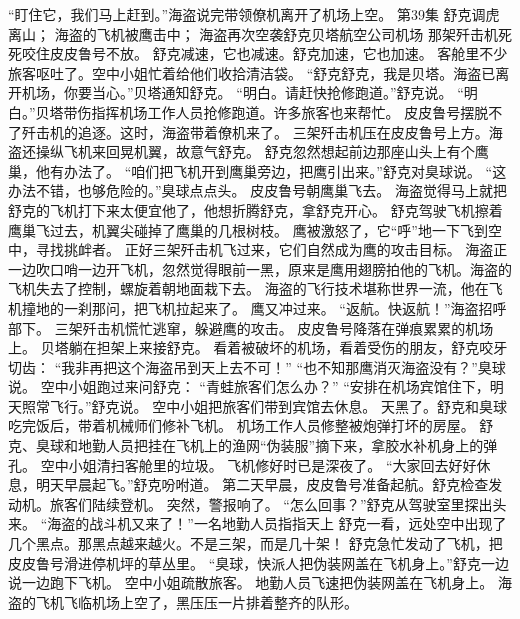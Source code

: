 \documentclass[a4paper,12pt,UTF8,twoside]{ctexbook}
\begin{document}
        “盯住它，我们马上赶到。”海盗说完带领僚机离开了机场上空。   第39集 
        舒克调虎离山； 
        海盗的飞机被鹰击中； 
        海盗再次空袭舒克贝塔航空公司机场   
        那架歼击机死死咬住皮皮鲁号不放。 
        舒克减速，它也减速。舒克加速，它也加速。 
        客舱里不少旅客呕吐了。空中小姐忙着给他们收拾清洁袋。 
        “舒克舒克，我是贝塔。海盗已离开机场，你要当心。”贝塔通知舒克。 
        “明白。请赶快抢修跑道。”舒克说。 
        “明白。”贝塔带伤指挥机场工作人员抢修跑道。许多旅客也来帮忙。 
        皮皮鲁号摆脱不了歼击机的追逐。这时，海盗带着僚机来了。 
        三架歼击机压在皮皮鲁号上方。海盗还操纵飞机来回晃机翼，故意气舒克。 
        舒克忽然想起前边那座山头上有个鹰巢，他有办法了。 
        “咱们把飞机开到鹰巢旁边，把鹰引出来。”舒克对臭球说。 
        “这办法不错，也够危险的。”臭球点点头。 
        皮皮鲁号朝鹰巢飞去。 
        海盗觉得马上就把舒克的飞机打下来太便宜他了，他想折腾舒克，拿舒克开心。 
        舒克驾驶飞机擦着鹰巢飞过去，机翼尖碰掉了鹰巢的几根树枝。 
        鹰被激怒了，它“呼”地一下飞到空中，寻找挑衅者。 
        正好三架歼击机飞过来，它们自然成为鹰的攻击目标。 
        海盗正一边吹口哨一边开飞机，忽然觉得眼前一黑，原来是鹰用翅膀拍他的飞机。海盗的飞机失去了控制，螺旋着朝地面栽下去。 
        海盗的飞行技术堪称世界一流，他在飞机撞地的一刹那问，把飞机拉起来了。 
        鹰又冲过来。 
        “返航。快返航！”海盗招呼部下。 
        三架歼击机慌忙逃窜，躲避鹰的攻击。 
        皮皮鲁号降落在弹痕累累的机场上。 
        贝塔躺在担架上来接舒克。 
        看着被破坏的机场，看着受伤的朋友，舒克咬牙切齿： 
        “我非再把这个海盗吊到天上去不可！” 
        “也不知那鹰消灭海盗没有？”臭球说。 
        空中小姐跑过来问舒克： 
        “青蛙旅客们怎么办？” 
        “安排在机场宾馆住下，明天照常飞行。”舒克说。 
        空中小姐把旅客们带到宾馆去休息。 
        天黑了。舒克和臭球吃完饭后，带着机械师们修补飞机。 
        机场工作人员修整被炮弹打坏的房屋。 
        舒克、臭球和地勤人员把挂在飞机上的渔网“伪装服”摘下来，拿胶水补机身上的弹孔。 
        空中小姐清扫客舱里的垃圾。 
        飞机修好时已是深夜了。 
        “大家回去好好休息，明天早晨起飞。”舒克吩咐道。 
        第二天早晨，皮皮鲁号准备起航。舒克检查发动机。旅客们陆续登机。 
        突然，警报响了。 
        “怎么回事？”舒克从驾驶室里探出头来。 
        “海盗的战斗机又来了！”一名地勤人员指指天上 
        舒克一看，远处空中出现了几个黑点。那黑点越来越火。不是三架，而是几十架！ 
        舒克急忙发动了飞机，把皮皮鲁号滑进停机坪的草丛里。 
        “臭球，快派人把伪装网盖在飞机身上。”舒克一边说一边跑下飞机。 
        空中小姐疏散旅客。 
        地勤人员飞速把伪装网盖在飞机身上。 
        海盗的飞机飞临机场上空了，黑压压一片排着整齐的队形。 
\end{document}
